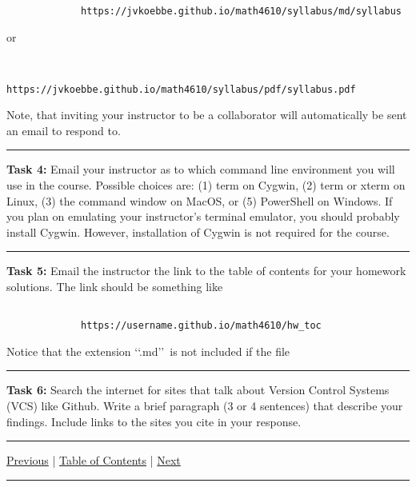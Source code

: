 \documentclass[10pt,fleqn]{article}
\begin{document}
\begin{trivlist}
\begin{verbatim}
             https://jvkoebbe.github.io/math4610/syllabus/md/syllabus

        \end{verbatim}
        or
        \begin{verbatim}

             https://jvkoebbe.github.io/math4610/syllabus/pdf/syllabus.pdf

        \end{verbatim}
        Note, that inviting your instructor to be a collaborator will
        automatically be sent an email to respond to.
\vskip0.1in\hrule\vskip0.1in \noindent
  \item[\bf Task 4:] Email your instructor as to which command line environment
        you will use in the course. Possible choices are: (1) term on Cygwin,
        (2) term or xterm on Linux, (3) the command window on MacOS, or (5)
        PowerShell on Windows. If you plan on emulating your instructor's
        terminal emulator, you should probably install Cygwin. However,
        installation of Cygwin is not required for the course.
\vskip0.1in\hrule\vskip0.1in \noindent
  \item[\bf Task 5:] Email the instructor the link to the table of contents
        for your homework solutions. The link should be something like
        \begin{verbatim}

             https://username.github.io/math4610/hw_toc

        \end{verbatim}
        Notice that the extension \lq\lq .md\rq\rq\ is not included if the file
\vskip0.1in\hrule\vskip0.1in \noindent
  \item[\bf Task 6:] Search the internet for sites that talk about Version
        Control Systems (VCS) like Github. Write a brief paragraph (3 or 4
        sentences) that describe your findings. Include links to the sites you
        cite in your response.
\end{trivlist}
\vskip0.1in\hrule\vskip0.1in \noindent
  \href{../../../README.md}{Previous} |
  \href{../../toc/md/tasksheet_toc.md}{Table of Contents} |
  \href{../../tasksheet_02/html/tasksheet_02.html}{Next}
\vskip0.1in\hrule\vskip0.1in \noindent
\end{document}
